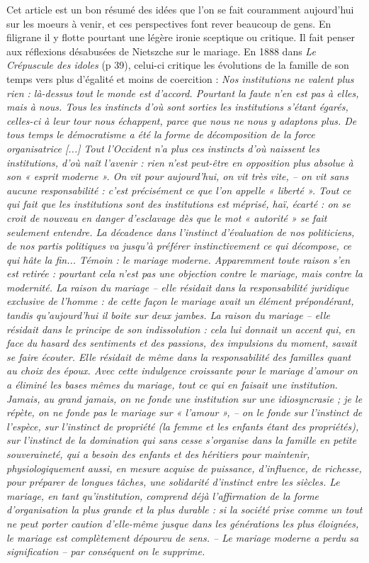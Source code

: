 Cet article est un bon résumé des idées que l'on se fait couramment aujourd'hui sur les moeurs à venir, et ces perspectives font rever beaucoup de gens. En filigrane il y flotte pourtant une légère ironie sceptique ou critique. Il fait penser aux réflexions désabusées de Nietszche sur le mariage. En 1888 dans \emph{Le Crépuscule des idoles} (p 39), celui-ci critique les évolutions de la famille de son temps vers plus d'égalité et moins de coercition : \emph{Nos institutions ne valent plus rien : là-dessus tout le monde est d'accord. Pourtant la faute n'en est pas à elles, mais à nous. Tous les instincts d'où sont sorties les institutions s'étant égarés, celles-ci à leur tour nous échappent, parce que nous ne nous y adaptons plus. De tous temps le démocratisme a été la forme de décomposition de la force organisatrice [...] Tout l'Occident n'a plus ces instincts d'où naissent les institutions, d'où naît l'avenir : rien n'est peut-être en opposition plus absolue à son « esprit moderne ». On vit pour aujourd'hui, on vit très vite, -- on vit sans aucune responsabilité : c'est précisément ce que l'on appelle « liberté ». Tout ce qui fait que les institutions sont des institutions est méprisé, haï, écarté : on se croit de nouveau en danger d'esclavage dès que le mot « autorité » se fait seulement entendre. La \emph{décadence} dans l'instinct d'évaluation de nos politiciens, de nos partis politiques va jusqu'à préférer instinctivement ce qui décompose, ce qui hâte la fin... Témoin : \emph{le mariage moderne}. Apparemment toute raison s'en est retirée : pourtant cela n'est pas une objection contre le mariage, mais contre la modernité. La raison du mariage -- elle résidait dans la responsabilité juridique exclusive de l'homme : de cette façon le mariage avait un élément prépondérant, tandis qu'aujourd'hui il boite sur deux jambes. La raison du mariage -- elle résidait dans le principe de son indissolution : cela lui donnait un accent qui, en face du hasard des sentiments et des passions, des impulsions du moment, \emph{savait se faire écouter}. Elle résidait de même dans la responsabilité des familles quant au choix des époux. Avec cette indulgence croissante pour le mariage \emph{d'amour} on a éliminé les bases mêmes du mariage, tout ce qui en faisait une institution. Jamais, au grand jamais, on ne fonde une institution sur une idiosyncrasie ; je le répète, on ne fonde pas le mariage sur « l'amour », -- on le fonde sur l'instinct de l'espèce, sur l'instinct de propriété (la femme et les enfants étant des propriétés), sur \emph{l'instinct de la domination} qui sans cesse s'organise dans la famille en petite souveraineté, qui a \emph{besoin} des enfants et des héritiers pour maintenir, physiologiquement aussi, en mesure acquise de puissance, d'influence, de richesse, pour préparer de longues tâches, une solidarité d'instinct entre les siècles. Le mariage, en tant qu'institution, comprend déjà l'affirmation de la forme d'organisation la plus grande et la plus durable : si la société prise comme un tout ne peut \emph{porter caution} d'elle-même jusque dans les générations les plus éloignées, le mariage est complètement dépourvu de sens. -- Le mariage moderne a perdu sa signification -- par conséquent on le supprime.}
 
